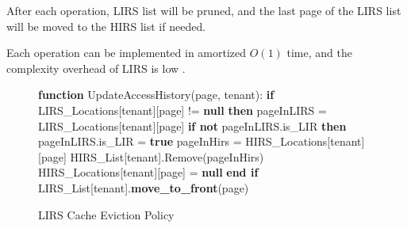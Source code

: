 After each operation, LIRS list will be pruned, and the last page of the LIRS list will be moved 
to the HIRS list if needed.

Each operation can be implemented in amortized $O(1)$ time, and the complexity overhead 
of LIRS is low \cite{lirs-article}.

\begin{figure}[htbp]
    \centering
    \begin{minipage}{\linewidth}
    \begin{algorithm}[H]
        \caption{LIRS Cache Eviction Policy}
        \begin{algorithmic}
            \STATE \textbf{function} UpdateAccessHistory(page, tenant):
            \STATE \hspace{\algorithmicindent} \textbf{if} LIRS\_Locations[tenant][page] != \textbf{null} \textbf{then}
            \STATE \hspace{\algorithmicindent} \hspace{\algorithmicindent} pageInLIRS = LIRS\_Locations[tenant][page]
            \STATE \hspace{\algorithmicindent} \hspace{\algorithmicindent} \textbf{if not} pageInLIRS.is\_LIR \textbf{then}
            \STATE \hspace{\algorithmicindent} \hspace{\algorithmicindent} \hspace{\algorithmicindent} pageInLIRS.is\_LIR = \textbf{true}
            \STATE \hspace{\algorithmicindent} \hspace{\algorithmicindent} \hspace{\algorithmicindent} pageInHirs = HIRS\_Locations[tenant][page]
            \STATE \hspace{\algorithmicindent} \hspace{\algorithmicindent} \hspace{\algorithmicindent} HIRS\_List[tenant].Remove(pageInHirs)
            \STATE \hspace{\algorithmicindent} \hspace{\algorithmicindent} \hspace{\algorithmicindent} HIRS\_Locations[tenant][page] = \textbf{null}
            \STATE \hspace{\algorithmicindent} \hspace{\algorithmicindent} \textbf{end if}
            \STATE \hspace{\algorithmicindent} \hspace{\algorithmicindent} LIRS\_List[tenant].\textbf{move\_to\_front}(page)

\end{algorithmic}
\end{algorithm}
\end{minipage}
\end{figure}
